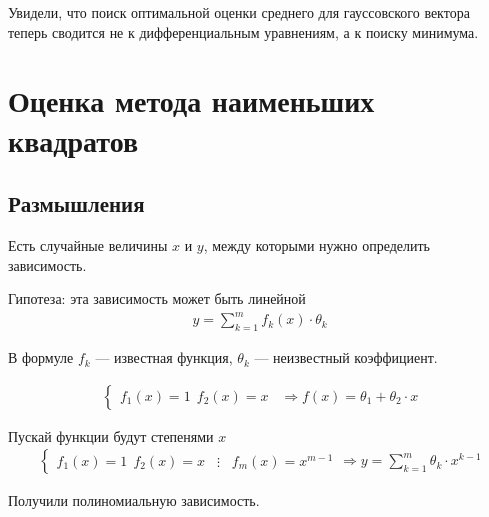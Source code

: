 Увидели, что поиск оптимальной оценки среднего для гауссовского вектора
теперь сводится не к дифференциальным уравнениям, а к поиску минимума.

\section{Оценка метода наименьших квадратов}

\subsection{Размышления}

Есть случайные величины $x$ и $y$, между которыми нужно определить зависимость.

Гипотеза: эта зависимость может быть линейной
\begin{align*}
  y = \sum_{k=1}^{m}f_k\left( x \right) \cdot \theta_k
\end{align*}

В формуле $f_k$ --- известная функция, $\theta_k$ --- неизвестный коэффициент.

\begin{example}
  \begin{align*}
      \begin{cases}
      f_1\left( x \right) = 1 \ \
      f_2\left( x \right) = x \ \
      \end{cases} \Rightarrow
      f\left( x \right) = \theta_1 + \theta_2 \cdot x
  \end{align*}
\end{example}

\begin{example}
  Пускай функции будут степенями $x$
  \begin{align*}
      \begin{cases}
      f_1\left( x \right) = 1 \ \
      f_2\left( x \right) = x \ \
      \begin{array}{c}
      \vdots
      \end{array} \ \
      f_m\left( x \right) = x^{m-1}
      \end{cases} \Rightarrow
      y = \sum_{k=1}^{m} \theta_k \cdot x^{k-1}
  \end{align*}

  Получили полиномиальную зависимость.
\end{example}

